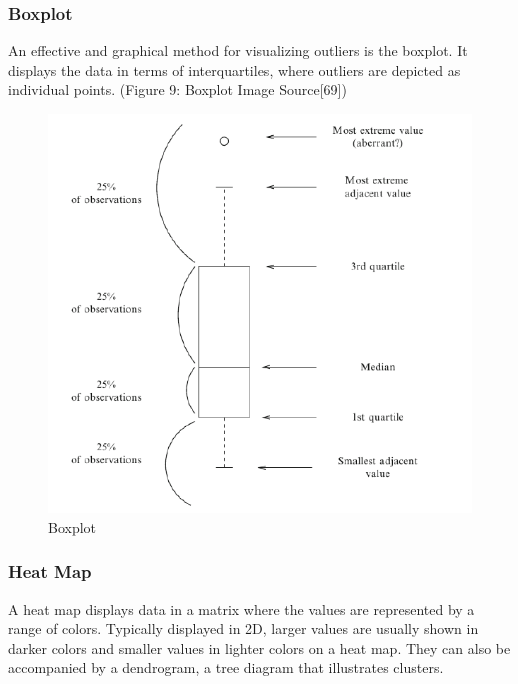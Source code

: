 \documentclass[11pt,]{article}
\begin{document}
\subsubsection{Boxplot}\label{boxplot}

An effective and graphical method for visualizing outliers is the
boxplot. It displays the data in terms of interquartiles, where outliers
are depicted as individual points. (Figure 9: Boxplot Image
Source{[}69{]})

\begin{figure}

{\centering \includegraphics{thesis_files/figure-latex/unnamed-chunk-15-1} 

}

\caption{Boxplot}\label{fig:unnamed-chunk-15}
\end{figure}

\subsubsection{Heat Map}\label{heat-map}

A heat map displays data in a matrix where the values are represented by
a range of colors. Typically displayed in 2D, larger values are usually
shown in darker colors and smaller values in lighter colors on a heat
map. They can also be accompanied by a dendrogram, a tree diagram that
illustrates clusters.
\end{document}
